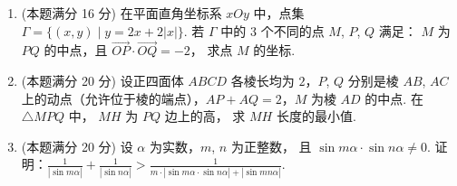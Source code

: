 \documentclass{chsmc}
\begin{document}
\begin{enumerate}[resume]
  \item (本题满分 16 分) 在平面直角坐标系 $xOy$ 中，点集
    $\Gamma = \{(x,y) \mid y = 2x+2|x|\}.$
    若 $\Gamma$ 中的 3 个不同的点 $M$, $P$, $Q$ 满足：
    $M$ 为 $PQ$ 的中点，且 $\overrightarrow{OP}\cdot\overrightarrow{OQ} = -2$，
    求点 $M$ 的坐标.
  \item (本题满分 20 分) 设正四面体 $\mathit{ABCD}$ 各棱长均为 $2$，$P$, $Q$
    分别是棱 $AB$, $AC$ 上的动点（允许位于棱的端点），$AP + AQ = 2$，$M$
    为棱 $AD$ 的中点. 在 $\triangle MPQ$ 中， $MH$ 为 $PQ$ 边上的高，
    求 $MH$ 长度的最小值.
  \item (本题满分 20 分) 设 $\alpha$ 为实数，$m$, $n$ 为正整数，
    且 $\sin m\alpha\cdot\sin n\alpha\neq 0$.
    证明：$\displaystyle\frac{1}{|\sin m\alpha|} + \frac{1}{|\sin n\alpha|}
    > \frac{1}{m\cdot |\sin m\alpha\cdot \sin n\alpha| + |\sin mn\alpha|}$.
\end{enumerate}
\end{document}
